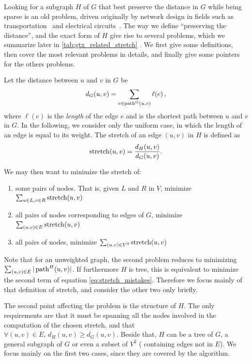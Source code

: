 \label{sub:gtx_state_of_the_art}

Looking for a subgraph $H$ of $G$ that best preserve the distance in $G$ while being sparse is an old
problem, driven originally by network design in fields such as transportation~\autocite{RoadNetworks60}
and electrical circuits~\autocite{electricalNetworks60}. The way we define \enquote{preserving the
distance}, and the exact form of $H$ give rise to several problems, which we summarize later in
\autoref{tab:gtx_related_stretch} . We first give some
definitions, then cover the most relevant problems in details, and finally give some pointers for
the others problems.

Let the distance between $u$ and $v$ in $G$ be
\begin{equation*}
  d_G(u,v) = \sum_{e \in \operatorname{path}^G(u, v)} \ell(e)\,,
\end{equation*}
where $\ell(e)$ is the \emph{length} of the edge $e$ and \pathguv{} is the shortest path between $u$
and $v$ in $G$. In the following, we consider only the uniform case, in which the length of an edge
is equal to its weight. The stretch of an edge $(u,v)$ in $H$ is defined as
\begin{equation*}
  \operatorname{stretch}(u,v) = \frac{d_H(u,v)}{d_G(u,v)}.
\end{equation*}

We may then want to minimize the stretch of:
\begin{enumerate}[1),nosep]%
  \item some pairs of nodes. That is, given $L$ and $R$ in $V$, minimize $\sum_{u \in L, v\in R}
    \operatorname{stretch}(u,v)$
  \item all pairs of nodes corresponding to edges of $G$, \ie{} minimize $\sum_{(u,v) \in E}
    \operatorname{stretch}(u,v)$
  \item all pairs of nodes, \ie{}  minimize $\sum_{(u,v) \in V^2} \operatorname{stretch}(u,v)$
\end{enumerate}
Note that for an unweighted graph, the second problem reduces to minimizing $\sum_{(u,v) \in E}
|\operatorname{path}^H(u, v)|$. If furthermore $H$ is tree, this is equivalent to minimize the second term of equation
\eqref{eq:stretch_mistakes}. Therefore we focus mainly of that definition of stretch, and consider
the other two only briefly.

The second point affecting the problem is the structure of $H$. The only requirements are that it
must be spanning all the nodes involved in the computation of the chosen stretch, and that $\forall
(u,v) \in E,\, d_H(u,v) \geq d_G(u,v)$. Beside that, $H$ can be a tree of $G$, a general subgraph of
$G$ or even a subset of $V^2$ (\ie{} containing edges not in $E$). We focus mainly on the first two
cases, since they are covered by the \gtx{} algorithm.

